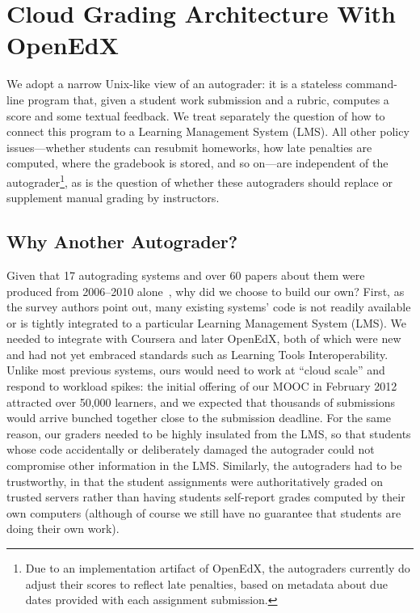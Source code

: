 \section{Cloud Grading Architecture With OpenEdX}
\label{sec:arch}

We adopt a narrow Unix-like view of an autograder: it is a
stateless command-line program that, given a student work submission and
a rubric, computes a score and some textual feedback.  We treat
separately the question of how to connect this program to a Learning
Management System (LMS).
All other policy issues---whether students can resubmit homeworks, how
late penalties are computed, where the gradebook is stored, and so 
on---are independent of the autograder\footnote{Due to an implementation
  artifact of OpenEdX, the autograders currently do adjust their scores
  to reflect late penalties, based on metadata about due dates provided
  with each assignment submission.}, as is the question of whether these
autograders should replace or supplement manual grading by instructors.

\subsection{Why Another Autograder?}

Given that 17 autograding systems and over 60 papers about them were
produced from 2006--2010 alone~\cite{ihantola-2010-autograding-survey},
why did we choose to build our own?
First, as the survey authors point
out, many existing systems' code
is not readily available or is tightly integrated to a particular Learning
Management System (LMS).  We needed to integrate with Coursera and
later OpenEdX, both of which were new and had not yet embraced
standards such as Learning Tools Interoperability.
Unlike most previous 
systems, ours would need to work at ``cloud scale'' and respond to
workload spikes: the initial
offering of our MOOC in February 2012  
attracted over 50,000 learners, and we expected
that thousands of submissions would arrive bunched together close to the
submission deadline.  For the same reason, our graders needed to be
highly insulated from the LMS, so that students whose code accidentally
or deliberately damaged the autograder could not compromise other
information in the LMS.
Similarly, 
the autograders had to be trustworthy, in that the student
assignments were authoritatively graded on trusted servers rather than
having students self-report grades computed by their own computers
(although of course we still have no guarantee that students are doing
their own work).


